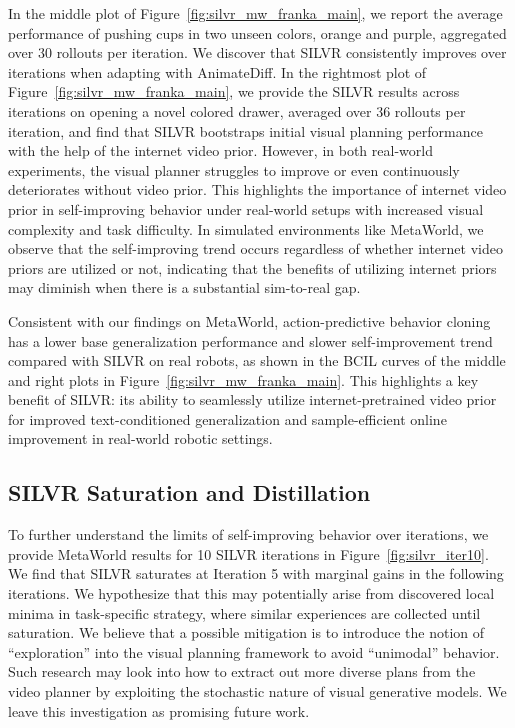 In the middle plot of Figure~\ref{fig:silvr_mw_franka_main}, we report the average performance of pushing cups in two unseen colors, orange and purple, aggregated over 30 rollouts per iteration. We discover that SILVR consistently improves over iterations when adapting with AnimateDiff. In the rightmost plot of Figure~\ref{fig:silvr_mw_franka_main}, we provide the SILVR results across iterations on opening a novel colored drawer, averaged over 36 rollouts per iteration, and find that SILVR bootstraps initial visual planning performance with the help of the internet video prior. However, in both real-world experiments, the visual planner struggles to improve or even continuously deteriorates without video prior. This highlights the importance of internet video prior in self-improving behavior under real-world setups with increased visual complexity and task difficulty. In simulated environments like MetaWorld, we observe that the self-improving trend occurs regardless of whether internet video priors are utilized or not, indicating that the benefits of utilizing internet priors may diminish when there is a substantial sim-to-real gap.

Consistent with our findings on MetaWorld, action-predictive behavior cloning has a lower base generalization performance and slower self-improvement trend compared with SILVR on real robots, as shown in the BCIL curves of the middle and right plots in Figure~\ref{fig:silvr_mw_franka_main}.  This highlights a key benefit of SILVR: its ability to seamlessly utilize internet-pretrained video prior for improved text-conditioned generalization and sample-efficient online improvement in real-world robotic settings.

\vspace{-0.5em}
\subsection{SILVR Saturation and Distillation}

To further understand the limits of self-improving behavior over iterations, we provide MetaWorld results for 10 SILVR iterations in Figure~\ref{fig:silvr_iter10}.  We find that SILVR saturates at Iteration 5 with marginal gains in the following iterations.  We hypothesize that this may potentially arise from discovered local minima in task-specific strategy, where similar experiences are collected until saturation.  We believe that a possible mitigation is to introduce the notion of “exploration” into the visual planning framework to avoid ``unimodal'' behavior. Such research may look into how to extract out more diverse plans from the video planner by exploiting the stochastic nature of visual generative models. We leave this investigation as promising future work.

